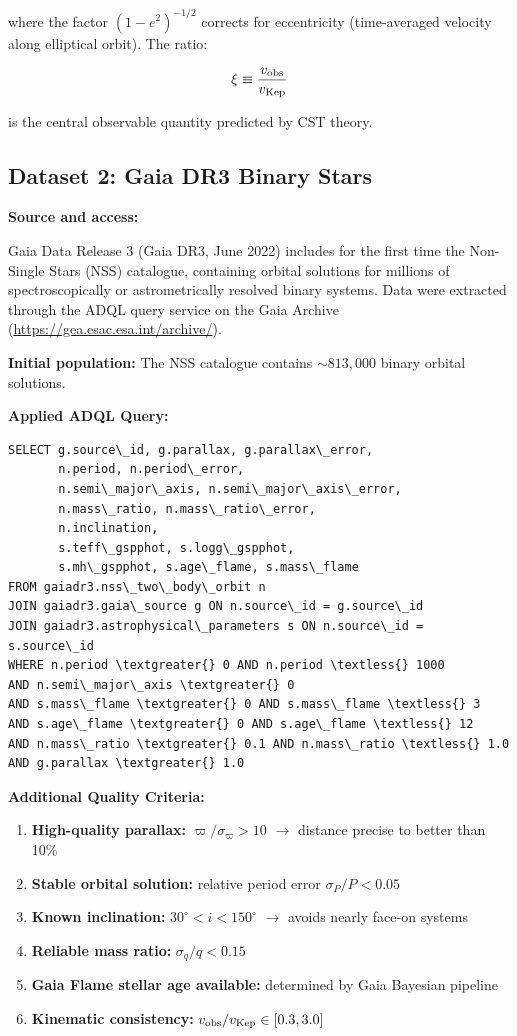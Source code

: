 \documentclass[11pt,a4paper]{article}
\providecommand{\tightlist}{\setlength{\itemsep}{0pt}\setlength{\parskip}{0pt}}
\begin{document}
where the factor \((1-e^2)^{-1/2}\) corrects for eccentricity
(time-averaged velocity along elliptical orbit). The ratio:

\[\xi \equiv \frac{v_{\rm obs}}{v_{\rm Kep}}\]

is the central observable quantity predicted by CST theory.

\hypertarget{dataset-2-gaia-dr3-binary-stars}{%
\subsection{Dataset 2: Gaia DR3 Binary
Stars}\label{dataset-2-gaia-dr3-binary-stars}}

\textbf{Source and access:}

Gaia Data Release 3 (Gaia DR3, June 2022) includes for the first time
the Non-Single Stars (NSS) catalogue, containing orbital solutions for
millions of spectroscopically or astrometrically resolved binary
systems. Data were extracted through the ADQL query service on the Gaia
Archive (\url{https://gea.esac.esa.int/archive/}).

\textbf{Initial population:} The NSS catalogue contains \(\sim 813,000\)
binary orbital solutions.

\textbf{Applied ADQL Query:}

\begin{lstlisting}
SELECT g.source\_id, g.parallax, g.parallax\_error,
       n.period, n.period\_error,
       n.semi\_major\_axis, n.semi\_major\_axis\_error,
       n.mass\_ratio, n.mass\_ratio\_error,
       n.inclination,
       s.teff\_gspphot, s.logg\_gspphot,
       s.mh\_gspphot, s.age\_flame, s.mass\_flame
FROM gaiadr3.nss\_two\_body\_orbit n
JOIN gaiadr3.gaia\_source g ON n.source\_id = g.source\_id  
JOIN gaiadr3.astrophysical\_parameters s ON n.source\_id = s.source\_id
WHERE n.period \textgreater{} 0 AND n.period \textless{} 1000
AND n.semi\_major\_axis \textgreater{} 0
AND s.mass\_flame \textgreater{} 0 AND s.mass\_flame \textless{} 3
AND s.age\_flame \textgreater{} 0 AND s.age\_flame \textless{} 12
AND n.mass\_ratio \textgreater{} 0.1 AND n.mass\_ratio \textless{} 1.0
AND g.parallax \textgreater{} 1.0
\end{lstlisting}

\textbf{Additional Quality Criteria:}

\begin{enumerate}
\def\labelenumi{\arabic{enumi}.}
\tightlist
\item
  \textbf{High-quality parallax:} \(\varpi/\sigma_\varpi > 10\) $\rightarrow$
  distance precise to better than 10\%
\item
  \textbf{Stable orbital solution:} relative period error
  \(\sigma_P/P < 0.05\)
\item
  \textbf{Known inclination:} \(30^{\circ} < i < 150^{\circ}\) $\rightarrow$ avoids nearly face-on
  systems
\item
  \textbf{Reliable mass ratio:} \(\sigma_q/q < 0.15\)
\item
  \textbf{Gaia Flame stellar age available:} determined by Gaia Bayesian
  pipeline
\item
  \textbf{Kinematic consistency:}
  \(v_{\rm obs}/v_{\rm Kep} \in [0.3, 3.0]\)
\end{enumerate}
\end{document}
